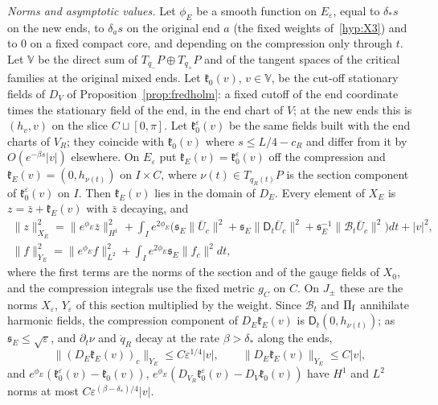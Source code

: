 \documentclass[11pt]{amsart}
\theoremstyle{definition}
\theoremstyle{remark}
\theoremstyle{plain}
\numberwithin{equation}{section}
\newcommand{\eps}{\varepsilon}
\begin{document}
\emph{Norms and asymptotic values.} Let $\phi_E$ be a smooth function on $E_\eps$, equal to
$\delta_*s$ on the new ends, to $\delta_as$ on the original end $a$ (the fixed
weights of~\ref{hyp:X3}) and to $0$ on a fixed compact core, and depending on the
compression only through $t$. Let $\mathbb V$ be the direct sum of
$T_{q_-}P\oplus T_{q_+}P$ and of the tangent spaces of the critical families at
the original mixed ends. Let $\mathfrak k_0(v)$, $v\in\mathbb V$, be the cut-off stationary fields of $D_V$ of Proposition~\ref{prop:fredholm}: a fixed cutoff of the end
coordinate times the stationary field of the end, in the end chart of $V$; at
the new ends this is $(h_v,v)$ on the slice $C\sqcup[0,\pi]$. Let
$\mathfrak k_0^\eps(v)$ be the same fields built with the end charts of $V_R$;
they coincide with $\mathfrak k_0(v)$ where $s\le L/4-c_R$ and differ from it by
$O(e^{-\beta s}|v|)$ elsewhere. On $E_\eps$ put $\mathfrak k_E(v)=\mathfrak
k^\eps_0(v)$ off the compression and $\mathfrak k_E(v)=(0,h_{\nu(t)})$ on
$I\times C$, where $\nu(t)\in T_{q_R(t)}P$ is the section component of $\mathfrak
k^\eps_0(v)$ on $I$. Then $\mathfrak k_E(v)$ lies in the domain of $D_E$. Every
element of $X_E$ is $z=\bar z+\mathfrak k_E(v)$ with $\bar z$ decaying, and
\begin{gather*}
\|z\|_{X_E}^2=\|e^{\phi_E}\bar z\|^2_{H^1}
+\int_Ie^{2\phi_E}\bigl({\mathfrak s}_E\|\bar U_c\|^2+{\mathfrak s}_E\|\mathsf D_t\bar U_c\|^2
+{\mathfrak s}_E^{-1}\|\mathcal B_t\bar U_c\|^2\bigr)dt+|v|^2,\\
\|f\|_{Y_E}^2=\|e^{\phi_E}f\|^2_{L^2}+\int_Ie^{2\phi_E}{\mathfrak s}_E\|f_c\|^2dt,
\end{gather*}
where the first terms are the norms of the section and of the gauge fields of
$X_0$, and the compression integrals use the fixed metric $g_C$ on $C$. On $J_\pm$
these are the norms $X_\eps$, $Y_\eps$ of this section multiplied by the weight.
Since $\mathcal B_t$ and $\Pi_{\rm f}$ annihilate harmonic fields, the compression
component of $D_E\mathfrak k_E(v)$ is $\mathsf D_t(0,h_{\nu(t)})$; as
${\mathfrak s}_E\le\sqrt\eps$, and $\partial_t\nu$ and $\dot q_R$ decay at the rate
$\beta>\delta_*$ along the ends,
\begin{equation}\label{eq:column-error}
\|(D_E\mathfrak k_E(v))_c\|_{Y_E}\le C\eps^{1/4}|v|,\qquad
\|D_E\mathfrak k_E(v)\|_{Y_E}\le C|v|,
\end{equation}
and $e^{\phi_E}(\mathfrak k_0^\eps(v)-\mathfrak k_0(v))$,
$e^{\phi_E}(D_{V_R}\mathfrak k_0^\eps(v)-D_V\mathfrak k_0(v))$ have $H^1$ and $L^2$
norms at most $C\eps^{(\beta-\delta_*)/4}|v|$.
\end{document}
